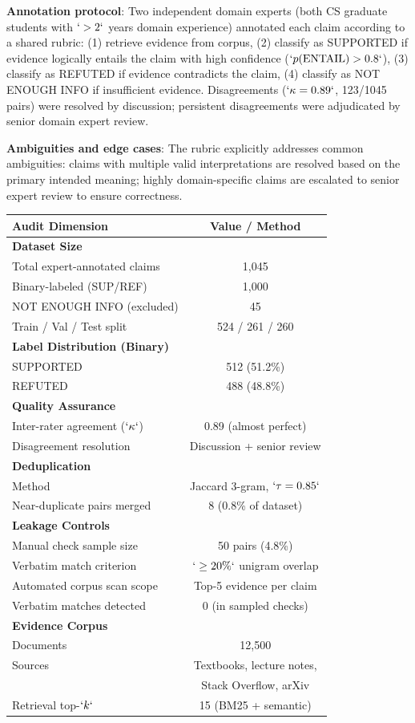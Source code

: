 \textbf{Annotation protocol}: Two independent domain experts (both CS graduate students with \(`>2`\) years domain experience) annotated each claim according to a shared rubric: (1) retrieve evidence from corpus, (2) classify as SUPPORTED if evidence logically entails the claim with high confidence (\(`p(\text{ENTAIL})>0.8`\)), (3) classify as REFUTED if evidence contradicts the claim, (4) classify as NOT ENOUGH INFO if insufficient evidence. Disagreements (\(`\kappa=0.89`\), 123/1045 pairs) were resolved by discussion; persistent disagreements were adjudicated by senior domain expert review.

\textbf{Ambiguities and edge cases}: The rubric explicitly addresses common ambiguities: claims with multiple valid interpretations are resolved based on the primary intended meaning; highly domain-specific claims are escalated to senior expert review to ensure correctness.

\protect{}\label{tab:dataset_audit}
{\def\LTcaptype{none} %
\begin{longtable}[]{@{}lc@{}}
\toprule\noalign{}
\textbf{Audit Dimension} & \textbf{Value / Method} \\
\midrule\noalign{}
\endhead
\bottomrule\noalign{}
\endlastfoot
\textbf{Dataset Size} & \\
Total expert-annotated claims & 1,045 \\
Binary-labeled (SUP/REF) & 1,000 \\
NOT ENOUGH INFO (excluded) & 45 \\
Train / Val / Test split & 524 / 261 / 260 \\
\textbf{Label Distribution (Binary)} & \\
SUPPORTED & 512 (51.2\%) \\
REFUTED & 488 (48.8\%) \\
\textbf{Quality Assurance} & \\
Inter-rater agreement (\(`\kappa`\)) & 0.89 (almost perfect) \\
Disagreement resolution & Discussion + senior review \\
\textbf{Deduplication} & \\
Method & Jaccard 3-gram, \(`\tau=0.85`\) \\
Near-duplicate pairs merged & 8 (0.8\% of dataset) \\
\textbf{Leakage Controls} & \\
Manual check sample size & 50 pairs (4.8\%) \\
Verbatim match criterion & \(`\geq20\%`\) unigram overlap \\
Automated corpus scan scope & Top-5 evidence per claim \\
Verbatim matches detected & 0 (in sampled checks) \\
\textbf{Evidence Corpus} & \\
Documents & 12,500 \\
Sources & Textbooks, lecture notes, \\
& Stack Overflow, arXiv \\
Retrieval top-\(`k`\) & 15 (BM25 + semantic) \\
\end{longtable}
}

